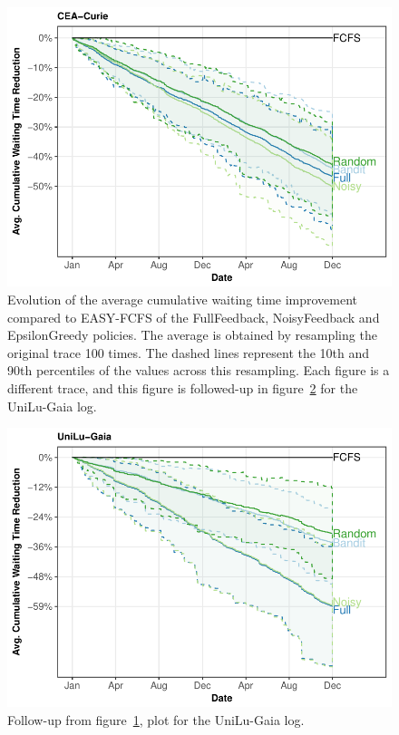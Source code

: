 \documentclass[sigconf]{acmart}
\begin{document}
\begin{figure}[h]
  \includegraphics[scale=0.6]{figures/ANL-Intr.pdf}

  \caption{Evolution of the average cumulative waiting time improvement
    compared to EASY-FCFS of the FullFeedback, NoisyFeedback and EpsilonGreedy
    policies. The average is obtained by resampling the original trace 100
    times. The dashed lines represent the 10th and 90th percentiles of the
  values across this resampling. Each figure is a different trace, and this
figure is followed-up in figure~\ref{fig:follow} for the UniLu-Gaia log.}

  \label{fig:small}
\end{figure}

\begin{figure}[ht]
  \centering
  \includegraphics[scale=0.6]{figures/UniLu-Ga.pdf}

  \caption{Follow-up from figure~\ref{fig:small}, plot for the UniLu-Gaia log.}

  \label{fig:follow}
\end{figure}
\end{document}

